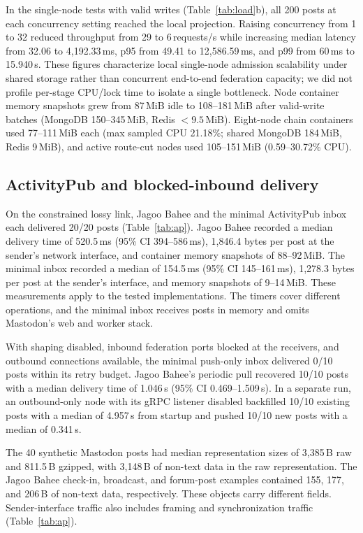 \documentclass[conference,a4paper,10pt]{IEEEtran}
\begin{document}
In the single-node tests with valid writes (Table~\ref{tab:load}b), all 200 posts at each concurrency setting reached the local projection. Raising concurrency from 1 to 32 reduced throughput from 29 to 6\,requests/s while increasing median latency from 32.06 to 4,192.33\,ms, p95 from 49.41 to 12,586.59\,ms, and p99 from 60\,ms to 15.940\,s. These figures characterize local single-node admission scalability under shared storage rather than concurrent end-to-end federation capacity; we did not profile per-stage CPU/lock time to isolate a single bottleneck. Node container memory snapshots grew from 87\,MiB idle to 108--181\,MiB after valid-write batches (MongoDB 150--345\,MiB, Redis $<9.5$\,MiB). Eight-node chain containers used 77--111\,MiB each (max sampled CPU 21.18\%; shared MongoDB 184\,MiB, Redis 9\,MiB), and active route-cut nodes used 105--151\,MiB (0.59--30.72\% CPU).

\subsection{ActivityPub and blocked-inbound delivery}

On the constrained lossy link, Jagoo Bahee and the minimal ActivityPub inbox each delivered 20/20 posts (Table~\ref{tab:ap}). Jagoo Bahee recorded a median delivery time of 520.5\,ms (95\% CI 394--586\,ms), 1,846.4 bytes per post at the sender's network interface, and container memory snapshots of 88--92\,MiB. The minimal inbox recorded a median of 154.5\,ms (95\% CI 145--161\,ms), 1,278.3 bytes per post at the sender's interface, and memory snapshots of 9--14\,MiB. These measurements apply to the tested implementations. The timers cover different operations, and the minimal inbox receives posts in memory and omits Mastodon's web and worker stack.

With shaping disabled, inbound federation ports blocked at the receivers, and outbound connections available, the minimal push-only inbox delivered 0/10 posts within its retry budget. Jagoo Bahee's periodic pull recovered 10/10 posts with a median delivery time of 1.046\,s (95\% CI 0.469--1.509\,s). In a separate run, an outbound-only node with its gRPC listener disabled backfilled 10/10 existing posts with a median of 4.957\,s from startup and pushed 10/10 new posts with a median of 0.341\,s.

The 40 synthetic Mastodon posts had median representation sizes of 3,385\,B raw and 811.5\,B gzipped, with 3,148\,B of non-text data in the raw representation. The Jagoo Bahee check-in, broadcast, and forum-post examples contained 155, 177, and 206\,B of non-text data, respectively. These objects carry different fields. Sender-interface traffic also includes framing and synchronization traffic (Table~\ref{tab:ap}).
\end{document}
